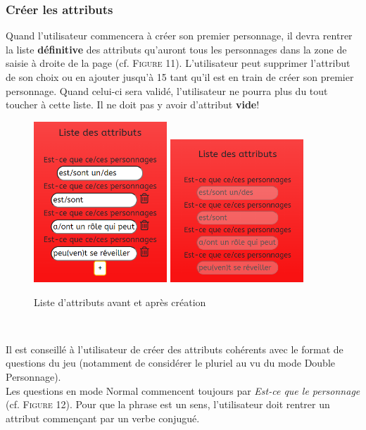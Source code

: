 \documentclass{article}
\begin{document}
            \subsubsection{Créer les attributs}
                Quand l'utilisateur commencera à créer son premier personnage, il devra rentrer la liste \textbf{définitive} des attributs qu'auront tous les personnages dans la zone de saisie à droite de la page (cf. \textsc{Figure 11}). L'utilisateur peut supprimer l'attribut de son choix ou en ajouter jusqu'à 15 tant qu'il est en train de créer son premier personnage. Quand celui-ci sera validé, l'utilisateur ne pourra plus du tout toucher à cette liste. Il ne doit pas y avoir d'attribut \textbf{vide}!\\
                \begin{figure}[h]
                    \centering \includegraphics[width=5cm]{images/exempleAttributs_creation.PNG} \includegraphics[width=5cm]{images/exempleAttributs_fige.PNG}
                    \caption{Liste d'attributs avant et après création}
                \end{figure}\\
                \par Il est conseillé à l'utilisateur de créer des attributs cohérents avec le format de questions du jeu (notamment de considérer le pluriel au vu du mode Double Personnage).\\
                Les questions en mode \textsf{Normal} commencent toujours par \textit{Est-ce que le personnage} (cf. \textsc{Figure 12}). Pour que la phrase est un sens, l'utilisateur doit rentrer un attribut commençant par un verbe conjugué.\\
\end{document}
